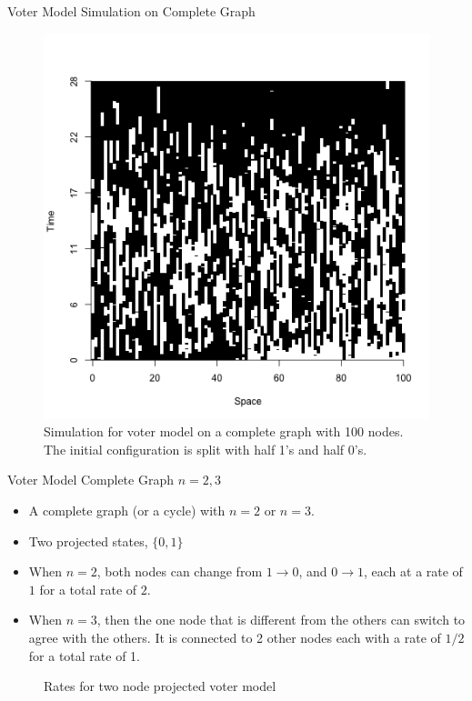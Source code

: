\documentclass{beamer}
\theoremstyle{definition}
\begin{document}
\begin{frame}{Voter Model Simulation on Complete Graph}
\begin{figure}[H]
  \centering
    \includegraphics[width=.6\textwidth]{figures/voter_simulation_1d_complete_split_100.png}
   \caption{Simulation for voter model on a complete graph with 100 nodes. The initial configuration is split with half 1's and half 0's.}
  \label{fig:voter_sim_1d_complete.png}
\end{figure}
\end{frame}

\begin{frame}{Voter Model Complete Graph $n = 2,3$}
    \begin{itemize}
        \item A complete graph (or a cycle) with $n = 2$ or $n = 3$.
        \item Two projected states, $\{0,1\}$
        \item When $n = 2$, both nodes can change from $1 \to 0$, and $0 \to 1$, each at a rate of $1$ for a total rate of $2$.
        \item When $n = 3$, then the one node that is different from the others can switch to agree with the others. It is connected to 2 other nodes each with a rate of $1/2$ for a total rate of 1.
    \end{itemize}
    
\begin{figure}[H]    
    \caption{Rates for two node projected voter model}
    \label{fig:rates_mc_two_contact}
\end{figure}
\end{frame}
\end{document}
